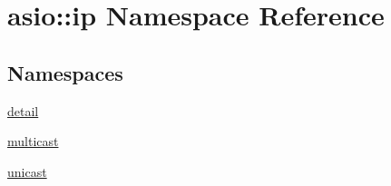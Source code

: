 \hypertarget{namespaceasio_1_1ip}{}\section{asio\+:\+:ip Namespace Reference}
\label{namespaceasio_1_1ip}
\subsection*{Namespaces}
\begin{DoxyCompactItemize}
\item 
 \hyperlink{namespaceasio_1_1ip_1_1detail}{detail}
\item 
 \hyperlink{namespaceasio_1_1ip_1_1multicast}{multicast}
\item 
 \hyperlink{namespaceasio_1_1ip_1_1unicast}{unicast}
\end{DoxyCompactItemize}
